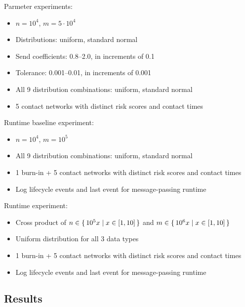 Parmeter experiments:

\begin{itemize}
  \item $n = 10^4$, $m = 5 \cdot 10^4$
  \item Distributions: uniform, standard normal
  \item Send coefficients: 0.8–2.0, in increments of 0.1
  \item Tolerance: 0.001–0.01, in increments of 0.001
  \item All 9 distribution combinations: uniform, standard normal
  \item 5 contact networks with distinct risk scores and contact times
\end{itemize}

Runtime baseline experiment:

\begin{itemize}
  \item $n = 10^4$, $m = 10^5$
  \item All 9 distribution combinations: uniform, standard normal
  \item 1 burn-in + 5 contact networks with distinct risk scores and contact times
  \item Log lifecycle events and last event for message-passing runtime
\end{itemize}

Runtime experiment:

\begin{itemize}
  \item Cross product of $n \in \set{ 10^5x | x \in [1, 10]}$ and $m \in \set{ 10^6x | x \in [1, 10]}$
  \item Uniform distribution for all 3 data types
  \item 1 burn-in + 5 contact networks with distinct risk scores and contact times
  \item Log lifecycle events and last event for message-passing runtime
\end{itemize}


\subsection{Results}